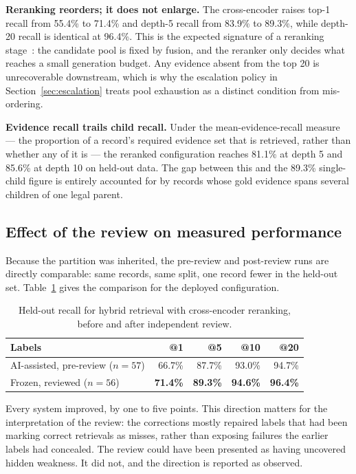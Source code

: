 \textbf{Reranking reorders; it does not enlarge.} The cross-encoder raises top-1
recall from 55.4\% to 71.4\% and depth-5 recall from 83.9\% to 89.3\%, while
depth-20 recall is identical at 96.4\%. This is the expected signature of a
reranking stage~\cite{nogueira2019reranking}: the candidate pool is fixed by
fusion, and the reranker only decides what reaches a small generation budget. Any
evidence absent from the top 20 is unrecoverable downstream, which is why the
escalation policy in Section~\ref{sec:escalation} treats pool exhaustion as a
distinct condition from mis-ordering.

\textbf{Evidence recall trails child recall.} Under the mean-evidence-recall
measure --- the proportion of a record's required evidence set that is retrieved,
rather than whether any of it is --- the reranked configuration reaches 81.1\% at
depth 5 and 85.6\% at depth 10 on held-out data. The gap between this and the
89.3\% single-child figure is entirely accounted for by records whose gold
evidence spans several children of one legal parent.

\subsection{Effect of the review on measured performance}

Because the partition was inherited, the pre-review and post-review runs are
directly comparable: same records, same split, one record fewer in the held-out
set. Table~\ref{tab:before-after} gives the comparison for the deployed
configuration.

\begin{table}[htbp]
  \centering
  \caption{Held-out recall for hybrid retrieval with cross-encoder reranking, before and after independent review.}
  \label{tab:before-after}
  \begin{tabular}{lrrrr}
    \toprule
    \textbf{Labels} & \textbf{@1} & \textbf{@5} & \textbf{@10} & \textbf{@20} \\
    \midrule
    AI-assisted, pre-review ($n = 57$) & 66.7\% & 87.7\% & 93.0\% & 94.7\% \\
    Frozen, reviewed ($n = 56$) & \textbf{71.4\%} & \textbf{89.3\%} & \textbf{94.6\%} & \textbf{96.4\%} \\
    \bottomrule
  \end{tabular}
\end{table}

Every system improved, by one to five points. This direction matters for the
interpretation of the review: the corrections mostly repaired labels that had been
marking correct retrievals as misses, rather than exposing failures the earlier
labels had concealed. The review could have been presented as having uncovered hidden weakness. It
did not, and the direction is reported as observed.

